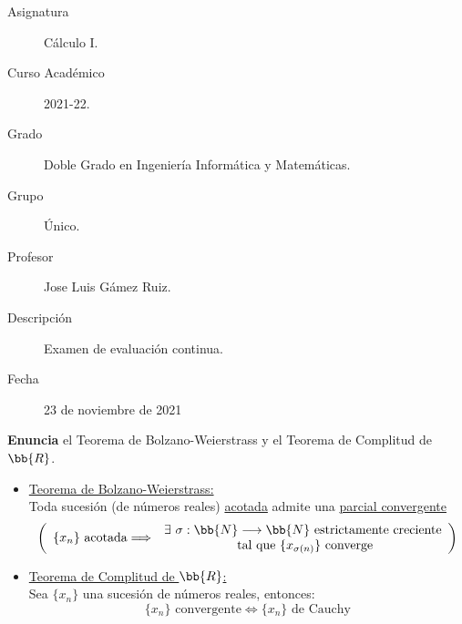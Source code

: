 \documentclass[12pt]{article}
\begin{document}

    
    

    \begin{description}
        \item[Asignatura] Cálculo I.
        \item[Curso Académico] 2021-22.
        \item[Grado] Doble Grado en Ingeniería Informática y Matemáticas.
        \item[Grupo] Único.
        \item[Profesor] Jose Luis Gámez Ruiz.
        \item[Descripción] Examen de evaluación continua.
        \item[Fecha] 23 de noviembre de 2021
    
    \end{description}
    \newpage

    \begin{ejercicio}[2 puntos]
        \textbf{Enuncia} el Teorema de Bolzano-Weierstrass y el Teorema de Complitud de $\bb{R}$.\\

        \begin{itemize}
            \item \underline{Teorema de Bolzano-Weierstrass:}\\
            
            Toda sucesión (de números reales) \underline{acotada} admite una \underline{parcial convergente}
            \begin{gather*}
            \left(
                \begin{array}{l}
                    \{x_n\} \text{ acotada} \Longrightarrow
                \end{array}
                \begin{array}{c}
                    \exists \ \sigma: \bb{N} \longrightarrow \bb{N} \text{ estrictamente creciente}\\
                    \text{ tal que } \{x_{\sigma(n)} \} \text{ converge}
                \end{array}
            \right)
            \end{gather*}

            \item \underline{Teorema de Complitud de $\bb{R}$:}\\
            
            Sea $\{x_n\}$ una sucesión de números reales, entonces: 
            \[
                \{x_n\} \text{ convergente} \Longleftrightarrow \{x_n\} \text{ de Cauchy}
            \]
        \end{itemize}
    \end{ejercicio}
\end{document}
